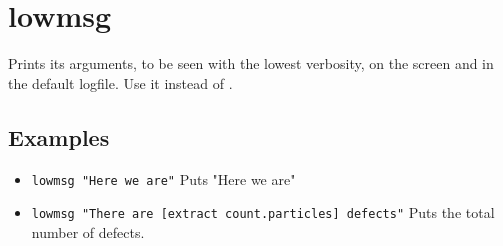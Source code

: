 \section{lowmsg}

Prints its arguments, to be seen with the lowest verbosity, on the screen and in the default logfile. Use it instead of .

\subsection{Examples}
\begin{itemize}
\item \verb+lowmsg "Here we are"+ Puts "Here we are"
\item \verb+lowmsg "There are [extract count.particles] defects"+ Puts the total number of defects.
\end{itemize}
